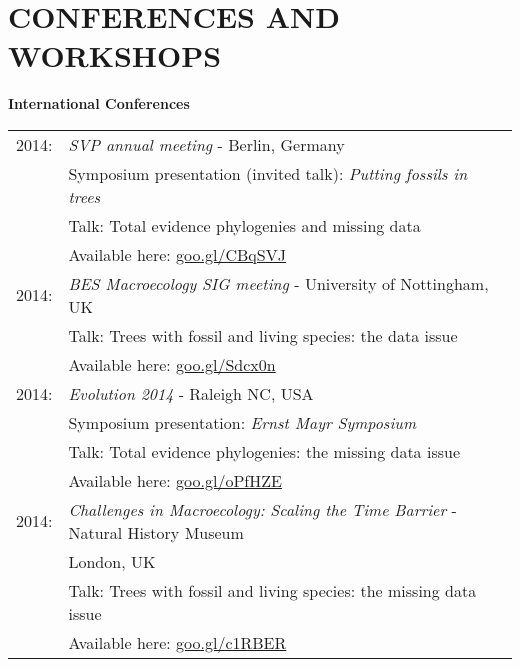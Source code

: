 \documentclass[10pt,a4paper]{article}
\begin{document}
{%
\section{CONFERENCES AND WORKSHOPS}

\raggedright\textbf{International Conferences}\\[1.5ex]
\begin{tabular}{ll}
2014: & \textit{SVP annual meeting} - Berlin, Germany\\
& Symposium presentation (invited talk): \textit{Putting fossils in trees}\\
& Talk: Total evidence phylogenies and missing data\\
& Available here: \href{http://figshare.com/articles/Total_evidence_phylogenies_the_missing_data_issue/1086216}{goo.gl/CBqSVJ}\\
2014: & \textit{BES Macroecology SIG meeting} - University of Nottingham, UK\\
& Talk: Trees with fossil and living species: the data issue\\ 
& Available here: \href{http://figshare.com/articles/Trees_with_fossil_and_living_species_the_data_issue/1056307}{goo.gl/Sdcx0n}\\
2014: & \textit{Evolution 2014} - Raleigh NC, USA\\
& Symposium presentation: \textit{Ernst Mayr Symposium} \\
& Talk: Total evidence phylogenies: the missing data issue\\
& Available here: \href{http://figshare.com/articles/Total_evidence_phylogenies_the_missing_data_issue/1086216}{goo.gl/oPfHZE}\\
2014: & \textit{Challenges in Macroecology: Scaling the Time Barrier} - Natural History Museum \\
& London, UK\\
& Talk: Trees with fossil and living species: the missing data issue\\
& Available here: \href{http://figshare.com/articles/Trees_with_fossil_and_living_species_the_data_issue/1056307}{goo.gl/c1RBER}\\

\end{tabular}}
\end{document}
